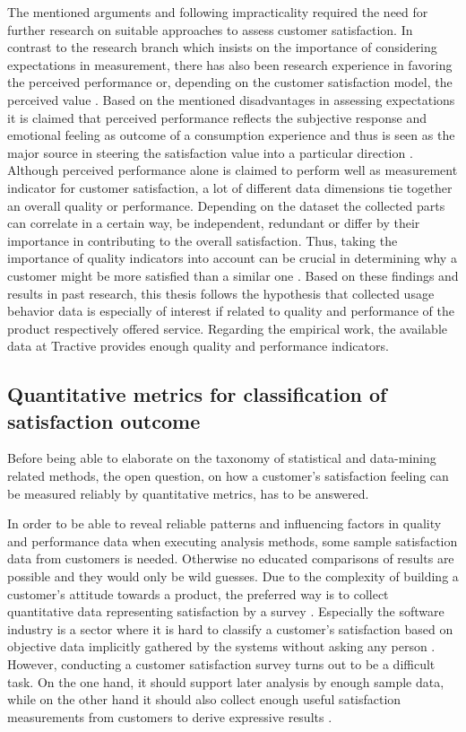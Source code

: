 The mentioned arguments and following impracticality required the need for further research on suitable approaches to assess customer satisfaction. In contrast to the research branch which insists on the importance of considering expectations in measurement, there has also been research experience in favoring the perceived performance or, depending on the customer satisfaction model, the perceived value \cite{yuksel1998customer}. Based on the mentioned disadvantages in assessing expectations it is claimed that perceived performance reflects the subjective response and emotional feeling as outcome of a consumption experience and thus is seen as the major source in steering the satisfaction value into a particular direction \cite{halstead1994multisource} \cite{cronin1992measuring}. Although perceived performance alone is claimed to perform well as measurement indicator for customer satisfaction, a lot of different data dimensions tie together an overall quality or performance. Depending on the dataset the collected parts can correlate in a certain way, be independent, redundant or differ by their importance in contributing to the overall satisfaction. Thus, taking the importance of quality indicators into account can be crucial in determining why a customer might be more satisfied than a similar one \cite{barsky1992customer}. Based on these findings and results in past research, this thesis follows the hypothesis that collected usage behavior data is especially of interest if related to quality and performance of the product respectively offered service. Regarding the empirical work, the available data at Tractive provides enough quality and performance indicators. 

\subsection{Quantitative metrics for classification of satisfaction outcome}
\label{ssec:quantitativeMetrics}
Before being able to elaborate on the taxonomy of statistical and data-mining related methods, the open question, on how a customer's satisfaction feeling can be measured reliably by quantitative metrics, has to be answered. 

In order to be able to reveal reliable patterns and influencing factors in quality and performance data when executing analysis methods, some sample satisfaction data from customers is needed. Otherwise no educated comparisons of results are possible and they would only be wild guesses. Due to the complexity of building a customer's attitude towards a product, the preferred way is to collect quantitative data representing satisfaction by a survey \cite{yuksel1998customer} \cite{hayes1998measuring}. Especially the software industry is a sector where it is hard to classify a customer's satisfaction based on objective data implicitly gathered by the systems without asking any person \cite{hayes1998measuring}. However, conducting a customer satisfaction survey turns out to be a difficult task. On the one hand, it should support later analysis by enough sample data, while on the other hand it should also collect enough useful satisfaction measurements from customers to derive expressive results \cite{sauermann2013increasing}. 

